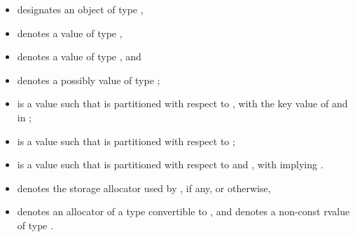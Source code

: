 \documentclass{wg21}
\begin{document}
\begin{itemize}
    \item
     designates an object of type ,
    \item
     denotes a value of type ,
    \item
     denotes a value of type , and
    \item
     denotes a possibly  value of type ;
    \item
     is a value such that  is partitioned
    with respect to , with  the key value of 
    and  in ;
    \item
     is a value such that  is partitioned with respect to
    ;
    \item
     is a value such that  is partitioned with respect to
     and , with  implying
    .
    \item
     denotes the storage allocator used by , if any, or  otherwise,
    \item
     denotes an allocator of a type convertible to ,
    and  denotes a non-const rvalue of type .
\end{itemize}

\newcommand{\indexordmem}[1]{%
    \indexlibrary{\idxcode{#1}!ordered associative containers}%
    \indexlibrary{\idxcode{set}!\idxcode{#1}}%
    \indexlibrary{\idxcode{map}!\idxcode{#1}}%
    \indexlibrary{\idxcode{multiset}!\idxcode{#1}}%
    \indexlibrary{\idxcode{multimap}!\idxcode{#1}}%
}
\end{document}
